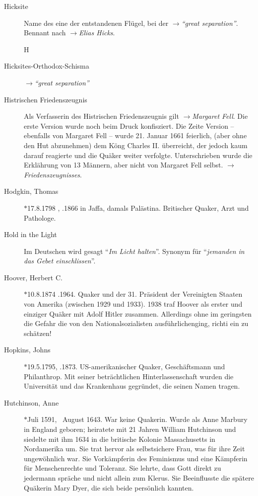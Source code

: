 \begin{description}
 \item[Hicksite] Name des eine der entstandenen Flügel, bei der
 $\to$\textit{"`great separation"'}. Bennant nach $\to$\textit{Elias Hicks}.

 H\item[Hicksites-Orthodox-Schisma]  $\to$\textit{"`great separation"'}

 \item[Histrischen Friedenszeugnis] Als Verfasserin des Histrischen Friedenszeugnis gilt $\to$\textit{Margaret Fell}. Die erste Version wurde noch beim Druck konfisziert. Die Zeite Version -- ebenfalls von Margaret Fell -- wurde 21. Januar 1661 feierlich, (aber ohne den Hut abzunehmen) dem Köng Charles II. überreicht, der jedoch kaum darauf reagierte und die Quäker weiter verfolgte. Unterschrieben wurde die Erklährung von 13 Männern, aber nicht von Margaret Fell selbst. $\to$\textit{Friedenszeugnisses}.

 
 \item[Hodgkin, Thomas] $\ast$17.8.1798 , .1866 in Jaffa, damals
 Palästina. Britischer Quaker, Arzt und Pathologe.

\item[Hold in the Light] Im Deutschen wird gesagt "`\textit{Im Licht halten}"'.
Synonym für "`\textit{jemanden in das Gebet einschlissen}"'.

 \item[Hoover, Herbert C.] $\ast$10.8.1874 .1964. Quaker und der 31.
 Präsident der Vereinigten Staaten von Amerika (zwischen 1929 und 1933). 1938
 traf Hoover als erster und einziger Quäker mit Adolf Hitler zusammen.
 Allerdings ohne im geringsten die Gefahr die von den Nationalsozialisten
 ausführlichenging, richti ein zu schätzen!

 \item[Hopkins, Johns] $\ast$19.5.1795, .1873. US-amerikanischer Quaker,
 Geschäftsmann und Philanthrop. Mit seiner beträchtlichen Hinterlassenschaft
 wurden die Universität und das Krankenhaus gegründet, die seinen Namen tragen.

 \item[Hutchinson, Anne] $\ast$Juli 1591, \dag~August 1643. War keine Quakerin. Wurde als Anne Marbury in England geboren; heiratete mit 21 Jahren William Hutchinson und siedelte mit ihm 1634 in die britische Kolonie Massachusetts in Nordamerika um. Sie trat hervor als selbstsichere Frau, was für ihre Zeit ungewöhnlich war. Sie Vorkämpferin des Feminismus und eine Kämpferin für Menschenrechte und Toleranz. Sie lehrte, dass Gott direkt zu jedermann spräche und nicht allein zum Klerus. Sie Beeinflusste die spätere Quäkerin Mary Dyer, die sich beide persönlich kannten.


 \end{description}

\normalsize
